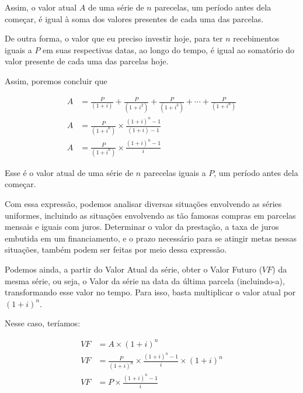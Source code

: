 Assim, o valor atual $A$ de uma série de $n$ parecelas, um período antes dela começar, é igual à soma dos valores presentes de cada uma das parcelas.

De outra forma, o valor que eu preciso investir hoje, para ter $n$ recebimentos iguais a $P$ em suas respectivas datas, ao longo do tempo, é igual ao somatório do valor presente de cada uma das parcelas hoje.

Assim, poremos concluir que

\begin{align*}
A&=\frac{P}{(1+i)}+\frac{P}{(1+i^2)}+\frac{P}{(1+i^3)}+\cdots+\frac{P}{(1+i^n)}\\
A&=\frac{P}{(1+i^n)}\times\frac{(1+i)^n-1}{(1+i)-1}\\
A&=\frac{P}{(1+i^n)}\times\frac{(1+i)^n-1}{i}
\end{align*}

Esse é o valor atual de uma série de $n$ parecelas iguais a $P$, um período antes dela começar.

Com essa expressão, podemos analisar diversas situações envolvendo as séries uniformes, incluindo as situações envolvendo as tão famosas compras em parcelas mensais e iguais com juros. Determinar o valor da prestação, a taxa de juros embutida em um financiamento, e o prazo necessário para se atingir metas nessas situações, também podem ser feitas por meio dessa expressão.

Podemos ainda, a partir do Valor Atual da série, obter o Valor Futuro ($VF$) da mesma série, ou seja, o Valor da série na data da última parcela (incluindo-a), transformando esse valor no tempo. Para isso, basta multiplicar o valor atual por $(1+i)^n$.

Nesse caso, teríamos:


\begin{align*}
VF&=A\times(1+i)^n\\
VF&=\frac{P}{(1+i)^n}\times\frac{(1+i)^n-1}{i}\times(1+i)^n\\
VF& =P\times\frac{(1+i)^n-1}{i}
\end{align*}

